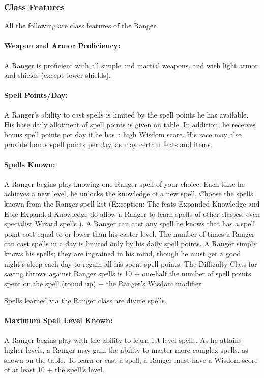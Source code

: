 \subsubsection{Class Features}
All the following are class features of the Ranger.

\paragraph{Weapon and Armor Proficiency:} 
A Ranger is proficient with all simple and martial weapons, and with light armor and shields (except tower shields).

\paragraph{Spell Points/Day:} A Ranger's ability to cast spells is limited by the spell points he has available. 
His base daily allotment of spell points is given on  table. 
In addition, he receives bonus spell points per day if he has a high Wisdom score.
His race may also provide bonus spell points per day, as may certain feats and items.

\paragraph{Spells Known:} A Ranger begins play knowing one Ranger spell of your choice. 
Each time he achieves a new level, he unlocks the knowledge of a new spell.
Choose the spells known from the Ranger spell list
(Exception: The feats Expanded Knowledge and Epic Expanded Knowledge do allow a Ranger to learn spells of other classes, even specialist Wizard spells.).
A Ranger can cast any spell he knows that has a spell point cost equal to or lower than his caster level.
The number of times a Ranger can cast spells in a day is limited only by his daily spell points. 
A Ranger simply knows his spells; they are ingrained in his mind, though he must get a good night's sleep each day to regain all his spent spell points.
The Difficulty Class for saving throws against Ranger spells is 10 + one-half the number of spell points spent on the spell (round up) + the Ranger's Wisdom modifier. 

Spells learned via the Ranger class are divine spells.
\paragraph{Maximum Spell Level Known:} A Ranger begins play with the ability to learn 1st-level spells. 
As he attains higher levels, a Ranger may gain the ability to master more complex spells, as shown on the  table.
To learn or cast a spell, a Ranger must have a Wisdom score of at least 10 + the spell's level.

